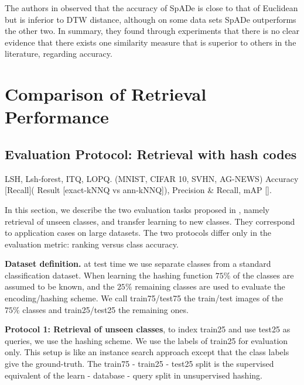 \documentclass{article}
\begin{document}
The authors in \cite{ding2008querying} observed that the accuracy of SpADe is close to that of Euclidean but is inferior to DTW distance, although on some data sets SpADe outperforms the other two. In summary, they found through experiments that there is no clear evidence that there exists one similarity measure that is superior to others in the literature, regarding accuracy. 



\section{Comparison of Retrieval Performance} %
   
\subsection{Evaluation Protocol: Retrieval with hash codes}
LSH, Lsh-forest, ITQ, LOPQ. (MNIST, CIFAR 10, SVHN, AG-NEWS)     
            	Accuracy  [Recall]( Result [exact-kNNQ vs ann-kNNQ]), Precision & Recall, mAP [].
 

  
 

In this section, we describe the two evaluation tasks proposed in \cite{sablayrolles2016should}, namely retrieval of unseen classes, and transfer learning to new classes. They correspond to application cases on large datasets. The two protocols differ only in the evaluation metric: ranking versus class accuracy.

\textbf{Dataset definition.} at test time we use separate classes from a standard classification dataset. When learning the hashing function $75\%$ of the classes are assumed to be known, and the $25\%$ remaining classes are used to evaluate the encoding/hashing scheme. We call train75/test75 the train/test images of the $75\%$ classes and train25/test25 the remaining ones.

\textbf{Protocol 1: Retrieval of unseen classes}, to index train25 and use test25 as queries, we use the hashing scheme. We use the labels of train25 for evaluation only. This setup is like an instance search approach except that the class labels give the ground-truth. The train75 - train25 - test25 split is the supervised equivalent of the learn - database - query split in unsupervised hashing.
\end{document}
